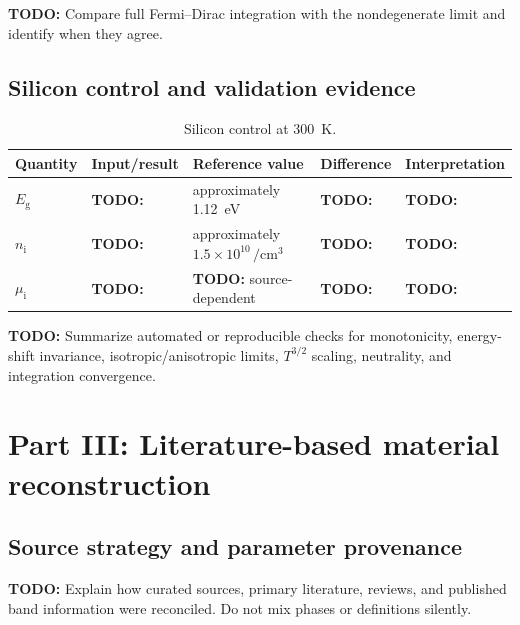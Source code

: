 \documentclass[11pt,a4paper]{article}
\newcommand{\Eg}{E_{\mathrm g}}
\newcommand{\mui}{\mu_{\mathrm i}}
\newcommand{\nIntrinsic}{n_{\mathrm i}}
\newcommand{\todo}[1]{\textcolor{BrickRed}{\textbf{TODO:} #1}}
\begin{document}
\todo{Compare full Fermi--Dirac integration with the nondegenerate limit and
identify when they agree.}

\subsection{Silicon control and validation evidence}

\begin{table}[htbp]
  \centering
  \caption{Silicon control at \SI{300}{\kelvin}.}
  \label{tab:silicon-control}
  \begin{tabular}{@{}lllll@{}}
    \toprule
    Quantity & Input/result & Reference value & Difference & Interpretation \\
    \midrule
    $\Eg$ & \todo{ } & approximately \SI{1.12}{\electronvolt} & \todo{ } & \todo{ } \\
    $\nIntrinsic$ & \todo{ } & approximately $1.5\times10^{10}\,\si{\per\centi\meter\cubed}$ & \todo{ } & \todo{ } \\
    $\mui$ & \todo{ } & \todo{source-dependent} & \todo{ } & \todo{ } \\
    \bottomrule
  \end{tabular}
\end{table}

\todo{Summarize automated or reproducible checks for monotonicity, energy-shift
invariance, isotropic/anisotropic limits, $T^{3/2}$ scaling, neutrality, and
integration convergence.}

\section{Part III: Literature-based material reconstruction}
\label{sec:material}

\subsection{Source strategy and parameter provenance}

\todo{Explain how curated sources, primary literature, reviews, and published
band information were reconciled. Do not mix phases or definitions silently.}
\end{document}
